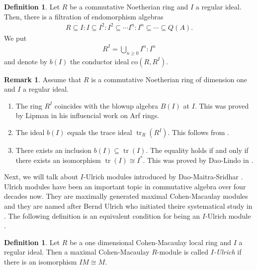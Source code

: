 \documentclass[12pt]{amsart}
\newcommand\co{\mathrm{co}}
\theoremstyle{definition}
\newtheorem{definition}[theorem]{Definition}
\newtheorem{remark}[theorem]{Remark}
\numberwithin{equation}{theorem}
\DeclareMathOperator{\tr}{\mathrm{tr}}
\begin{document}
\begin{definition}
    Let $R$ be a commutative Noetherian ring and $I$ a regular ideal. Then, there is a filtration of endomorphism algebras 
    \begin{align*}
    R \subseteq I \colon I \subseteq I^2 \colon I^2 \subseteq \cdots I^n \colon I^n \subseteq \cdots \subseteq Q(A).
    \end{align*}
    We put 
    \begin{align*}
    R^I = \bigcup_{n \geq 0} I^n \colon I^n
    \end{align*}        
    and denote by $b(I)$ the conductor ideal $\co(R,R^I)$.
\end{definition}
\begin{remark}\label{blow-up-remarks}
    Assume that $R$ is a commutative Noetherian ring of dimension one and $I$ a regular ideal.
    \begin{enumerate}
        \item The ring $R^I$ coincides with the blowup algebra $B(I)$ at $I$. This was proved by Lipman in his influencial work \cite{Lipman} on Arf rings.
        \item The ideal $b(I)$ equals the trace ideal $\tr_R(R^I)$. This follows from \cite[Proposition 2.4]{Kobayashi-Takahashi-Trace}.
        \item There exists an inclusion $b(I) \subseteq \tr(I)$. The equality holds if and only if there exists an isomorphism $\tr(I) \cong I^*$. This was proved by Dao-Lindo in \cite[Proposition 4.6 and Proposition 4.7]{Dao-Lindo}.
    \end{enumerate}
\end{remark}
Next, we will talk about $I$-Ulrich modules introduced by Dao-Maitra-Sridhar \cite{Dao-Maitra-Sridhar}. Ulrich modules have been an important topic in commutative algebra over four decades now. They are maximally generated maximal Cohen-Macaulay modules and they are named after Bernd Ulrich who initiated theire systematical study in \cite{Ulrich}. The following definition is an equivalent condition for being an $I$-Ulrich module \cite[Theorem 4.6]{Dao-Maitra-Sridhar}. 
\begin{definition}
    Let $R$ be a one dimensional Cohen-Macaulay local ring and $I$ a regular ideal. Then a maximal Cohen-Macaulay $R$-module is called \textit{$I$-Ulrich} if there is an isomorphism $IM \cong M$.
\end{definition}
\end{document}
